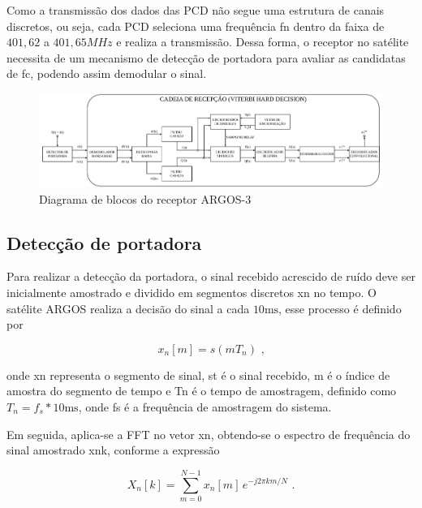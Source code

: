 Como a transmissão dos dados das \gls{PCD} não segue uma estrutura de canais discretos, ou seja, cada \gls{PCD} seleciona uma frequência \gls{fn} dentro da faixa de $401,62$ a $401,65MHz$ e realiza a transmissão. Dessa forma, o receptor no satélite necessita de um mecanismo de detecção de portadora para avaliar as candidatas de \gls{fc}, podendo assim demodular o sinal.

\begin{figure}[H]
	\centering
	\caption{Diagrama de blocos do receptor ARGOS-3}\label{fig:diagrama_receptor}
	\includegraphics[width=\linewidth]{assets/cap2/receptor.pdf}
\end{figure}


\subsection{Detecção de portadora}

Para realizar a detecção da portadora, o sinal recebido acrescido de ruído deve ser inicialmente amostrado e dividido em segmentos discretos \gls{xn} no tempo. O satélite \gls{ARGOS} realiza a decisão do sinal a cada $10 \text{ms}$, esse processo é definido por 

\vspace{-0.4em}
\begin{equation}
    x_n[m] = s(mT_n) \text{ ,}
\end{equation}

\noindent onde \gls{xn} representa o segmento de sinal, \gls{st} é o sinal recebido, \gls{m} é o índice de amostra do segmento de tempo e \gls{Tn} é o tempo de amostragem, definido como $T_n = f_s * 10 \text{ms}$, onde \gls{fs} é a frequência de amostragem do sistema. 


Em seguida, aplica-se a \gls{FFT} no vetor \gls{xn}, obtendo-se o espectro de frequência do sinal amostrado \gls{xnk}, conforme a expressão 

\vspace{-0.4em}
\begin{equation}
    X_n[k] = \sum_{m=0}^{N-1} x_n[m]\, e^{-j2\pi km/N} \text{ .}
\end{equation}

